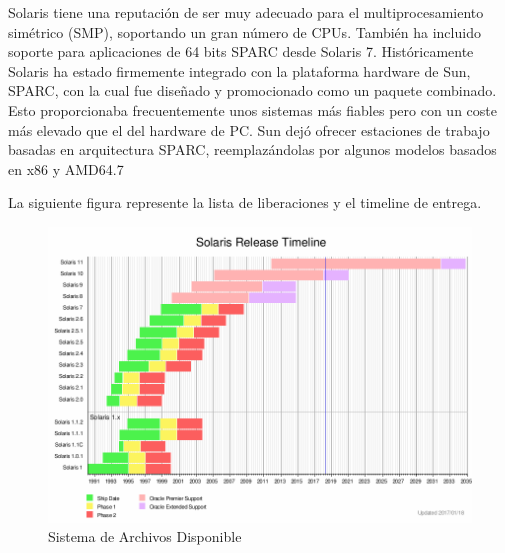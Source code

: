 \documentclass[paper=a4, fontsize=12pt]{article} 		%
\numberwithin{equation}{section}						%
\numberwithin{table}{section} 							%
\begin{document}
Solaris tiene una reputación de ser muy adecuado para el multiprocesamiento simétrico (SMP), soportando un gran número de CPUs. También ha incluido soporte para aplicaciones de 64 bits SPARC desde Solaris 7. Históricamente Solaris ha estado firmemente integrado con la plataforma hardware de Sun, SPARC, con la cual fue diseñado y promocionado como un paquete combinado. Esto proporcionaba frecuentemente unos sistemas más fiables pero con un coste más elevado que el del hardware de PC.  Sun dejó ofrecer estaciones de trabajo basadas en arquitectura SPARC, reemplazándolas por algunos modelos basados en x86 y AMD64.7

La siguiente figura represente la lista de liberaciones y el timeline de entrega. 

\begin{center}
\begin{figure}[H]
\includegraphics[scale=0.5]{img/releases.png}
\caption{Sistema de Archivos Disponible}
\label{fig:dis2}
\end{figure}
\end{center}
\end{document}
